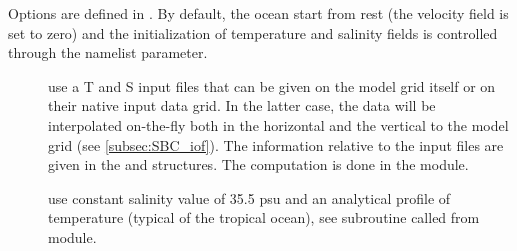 \documentclass[../main/NEMO_manual]{subfiles}
\begin{document}
Options are defined in .
By default, the ocean start from rest (the velocity field is set to zero) and the initialization of temperature and salinity fields is controlled through the  namelist parameter.
\begin{description}
\item[]
  use a T and S input files that can be given on the model grid itself or on their native input data grid.
  In the latter case,
  the data will be interpolated on-the-fly both in the horizontal and the vertical to the model grid
  (see \autoref{subsec:SBC_iof}).
  The information relative to the input files are given in the  and  structures.
  The computation is done in the  module.
\item[]
  use constant salinity value of 35.5 psu and an analytical profile of temperature (typical of the tropical ocean),
  see  subroutine called from  module.
\end{description}

\biblio

\pindex
\end{document}
